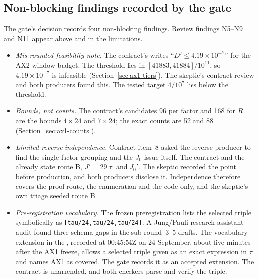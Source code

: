 \subsection{Non-blocking findings recorded by the gate}
\label{sec:ax1-findings}
The gate's decision records four non-blocking findings. Review findings
N5--N9 and N11 appear above and in the limitations.
\begin{itemize}
\item \emph{Mis-rounded feasibility note.} The contract's
 writes ``$D'\le4.19\times10^{-7}$'' for the AX2 window
budget. The threshold lies in $[41883,41884]/10^{11}$, so $4.19\times10^{-7}$
is infeasible (Section~\ref{sec:ax1-tiers}). The skeptic's contract review
and both producers found this. The tested target $4/10^7$ lies below the
threshold.
\item \emph{Bounds, not counts.} The contract's candidates 96 per factor and
168 for $R$ are the bounds $4\times24$ and $7\times24$; the exact counts are
52 and 88 (Section~\ref{sec:ax1-counts}).
\item \emph{Limited reverse independence.} Contract item~8 asked the reverse
producer to find the single-factor grouping and the $J_0$ issue itself. The
contract and the
 already
state route B,
$J'=29|\tau|$ and $J_0'$. The skeptic recorded the point before production,
and both producers disclose it. Independence therefore covers the proof
route, the enumeration and the code only, and the skeptic's own triage
seeded route B.
\item \emph{Pre-registration vocabulary.} The frozen preregistration lists
the selected triple symbolically as
\texttt{[\textquotesingle{}tau/24\textquotesingle{},\textquotesingle{}tau/24\textquotesingle{},\textquotesingle{}tau/24\textquotesingle{}]}.
A Jung/Pauli research-assistant audit found three schema gaps in the
sub-round~3--5 drafts. The vocabulary extension in the
, recorded at
00:45:54Z on 24 September, about five minutes after the AX1 freeze, allows a selected triple given as an exact expression in $\tau$ and names AX1
as covered. The gate records it as an accepted extension. The contract is
unamended, and both checkers parse and verify the triple.
\end{itemize}

